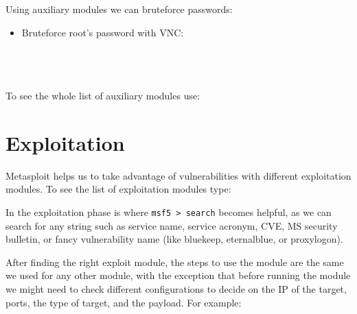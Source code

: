 Using auxiliary modules we can bruteforce passwords:

\begin{itemize}
    \item Bruteforce root's password with VNC:\\
     \\
     \\
     \\
\end{itemize}

\begin{tipbox}[frametitle=Tip: Displaying all auxiliary modules]
    To see the whole list of auxiliary modules use: \\
\end{tipbox}

\section{Exploitation}

Metasploit helps us to take advantage of vulnerabilities with different exploitation modules. To see the list of exploitation modules type: 


In the exploitation phase is where \texttt{msf5 > search} becomes helpful, as we can search for any string such as service name, service acronym, CVE, MS security bulletin, or fancy vulnerability name (like bluekeep, eternalblue, or proxylogon).

After finding the right exploit module, the steps to use the module are the same we used for any other module, with the exception that before running the module we might need to check different configurations to decide on the IP of the target, ports, the type of target, and the payload. For example:

